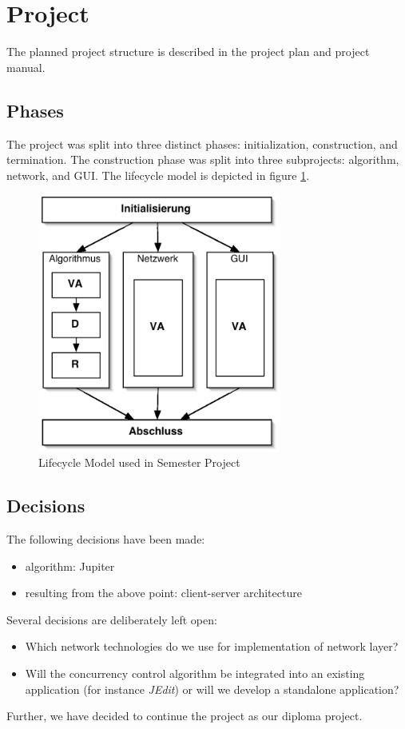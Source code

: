 \documentclass[11pt,a4paper]{article}
\begin{document}
\section{Project}
The planned project structure is described in the project plan and project manual.

\subsection{Phases}
The project was split into three distinct phases: initialization, construction, and termination. The construction phase was split into three subprojects: algorithm, network, and GUI. The lifecycle model is depicted in figure \ref{fig:lifecycle}.

\begin{figure}[H]
 \centering
 \includegraphics[width=8cm,height=8.5cm]{../../images/vorgehensmodell.eps}
 \caption{Lifecycle Model used in Semester Project}
 \label{fig:lifecycle}
\end{figure}

\subsection{Decisions}
The following decisions have been made:
\begin{itemize}
 \item algorithm: Jupiter
 \item resulting from the above point: client-server architecture
\end{itemize}
Several decisions are deliberately left open:
\begin{itemize}
 \item Which network technologies do we use for implementation of network layer?
 \item Will the concurrency control algorithm be integrated into an existing application (for instance \emph{JEdit}) or will we develop a standalone application?
\end{itemize}
Further, we have decided to continue the project as our diploma project.
\end{document}
